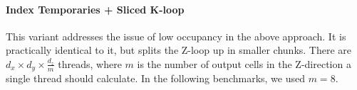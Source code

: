\paragraph{Index Temporaries + Sliced K-loop} This variant addresses the issue of low occupancy in the above approach. It is practically identical to it, but splits the Z-loop up in smaller chunks. There are $d_x\times d_y\times \frac{d_z}{m}$ threads, where $m$ is the number of output cells in the Z-direction a single thread should calculate. In the following benchmarks, we used $m=8$.


